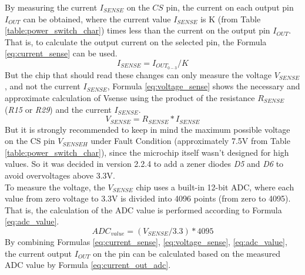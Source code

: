 \documentclass[10pt]{datasheet}
\begin{document}
By measuring the current $I_{SENSE}$ on the $CS$ pin, the current on each output pin $I_{OUT}$ can be obtained, where the current value $I_{SENSE}$ is K (from Table \ref{table:power_switch_char}) times less than the current on the output pin $I_{OUT}$. That is, to calculate the output current on the selected pin, the Formula \ref{eq:current_sense} can be used.
\begin{equation}
\label{eq:current_sense}
I_{SENSE} = I_{OUT_{0-3}} / K
\end{equation}
But the chip that should read these changes can only measure the voltage $V_{SENSE}$, and not the current $I_{SENSE}$, Formula \ref{eq:voltage_sense} shows the necessary and approximate calculation of Vsense using the product of the resistance $R_{SENSE}$ (\textit{R15} or \textit{R29}) and the current $I_{SENSE}$.
\begin{equation}
\label{eq:voltage_sense}
V_{SENSE} = R_{SENSE} * I_{SENSE}
\end{equation}
But it is strongly recommended to keep in mind the maximum possible voltage on the CS pin $V_{SENSEH}$ under Fault Condition (approximately 7.5V from Table \ref{table:power_switch_char}), since the microchip itself wasn't designed for high values. So it was decided in version 2.2.4 to add a zener diodes \textit{D5} and \textit{D6} to avoid overvoltages above 3.3V. \\
To measure the voltage, the $V_{SENSE}$ chip uses a built-in 12-bit ADC, where each value from zero voltage to 3.3V is divided into 4096 points (from zero to 4095). That is, the calculation of the ADC value is performed according to Formula \ref{eq:adc_value}.
\begin{equation}
\label{eq:adc_value}
ADC_{value} = (V_{SENSE} / 3.3) * 4095
\end{equation}
By combining Formulas \ref{eq:current_sense}, \ref{eq:voltage_sense}, \ref{eq:adc_value}, the current output $I_{OUT}$ on the pin can be calculated based on the measured ADC value by Formula \ref{eq:current_out_adc}.
\end{document}
